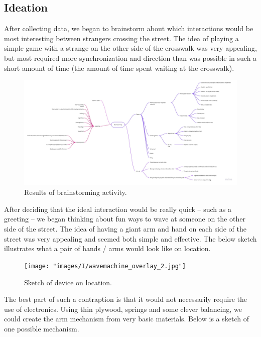 \documentclass[11pt]{report}
\begin{document}
\subsection*{Ideation}

After collecting data, we began to brainstorm about which interactions would be most interesting between strangers crossing the street. The idea of playing a simple game with a strange on the other side of the crosswalk was very appealing, but most required more synchronization and direction than was possible in such a short amount of time (the amount of time spent waiting at the crosswalk).
 
\begin{figure}[ht]
\centering
\includegraphics[width=1.4\textwidth, angle=90]{"images/I/ms1_brainstorming.png"}
\caption{Results of brainstorming activity.}
\label{fig:brainstorm}
\end{figure}

After deciding that the ideal interaction would be really quick -- such as a greeting -- we began thinking about fun ways to wave at someone on the other side of the street. The idea of having a giant arm and hand on each side of the street was very appealing and seemed both simple and effective. The below sketch illustrates what a pair of hands / arms would look like on location.
 
\begin{figure}[ht]
\centering
\texttt{[image: "images/I/wavemachine\_overlay\_2.jpg"]}
\caption{Sketch of device on location.}
\label{fig:overlay}
\end{figure}

The best part of such a contraption is that it would not necessarily require the use of electronics. Using thin plywood, springs and some clever balancing, we could create the arm mechanism from very basic materials. Below is a sketch of one possible mechanism.
 
\end{document}
